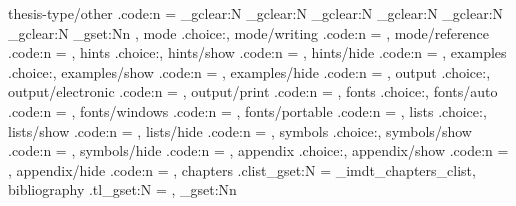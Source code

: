 {  thesis-type/other .code:n = { \tl_gclear:N \TypeResearch \tl_gclear:N \TypeSurvey \tl_gclear:N \TypeCase \tl_gclear:N \TypeProduct \tl_gclear:N \TypeScheme \tl_gclear:N \TypeOther \tl_gset:Nn \TypeOther {\tick} },
  mode .choice:,
  mode/writing .code:n = {\IMDTReferenceReportfalse},
  mode/reference .code:n = {\IMDTReferenceReporttrue},
  hints .choice:,
  hints/show .code:n = {\IMDTDrafttrue},
  hints/hide .code:n = {\IMDTDraftfalse},
  examples .choice:,
  examples/show .code:n = {\IMDTShowExamplestrue},
  examples/hide .code:n = {\IMDTShowExamplesfalse},
  output .choice:,
  output/electronic .code:n = {\IMDTPrintfalse},
  output/print .code:n = {\IMDTPrinttrue},
  fonts .choice:,
  fonts/auto .code:n = {\IMDTAutoFontstrue\IMDTUseWindowsFontsfalse},
  fonts/windows .code:n = {\IMDTAutoFontsfalse\IMDTUseWindowsFontstrue},
  fonts/portable .code:n = {\IMDTAutoFontsfalse\IMDTUseWindowsFontsfalse},
  lists .choice:,
  lists/show .code:n = {\IMDTShowListstrue},
  lists/hide .code:n = {\IMDTShowListsfalse},
  symbols .choice:,
  symbols/show .code:n = {\IMDTShowSymbolstrue},
  symbols/hide .code:n = {\IMDTShowSymbolsfalse},
  appendix .choice:,
  appendix/show .code:n = {\IMDTIncludeAppendixtrue},
  appendix/hide .code:n = {\IMDTIncludeAppendixfalse},
  chapters .clist_gset:N = \g_imdt_chapters_clist,
  bibliography .tl_gset:N = \IMDTBibliographyFiles,
}
\tl_gset:Nn 
\NewDocumentCommand{}
\NewDocumentCommand\imdtshowhints{}{\IMDTDrafttrue}
\NewDocumentCommand\imdthidehints{}{\IMDTDraftfalse}
\NewDocumentCommand\imdtshowexamples{}{\IMDTShowExamplestrue}
\NewDocumentCommand\imdthideexamples{}{\IMDTShowExamplesfalse}
\NewDocumentCommand{}
\NewDocumentCommand{}
\NewDocumentCommand{}
\ExplSyntaxOff
\NewDocumentCommand{}
